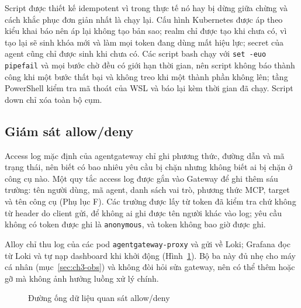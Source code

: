 \documentclass[a4paper]{article}
\begin{document}
Script được thiết kế idempotent vì trong thực tế nó hay bị dừng giữa chừng và cách khắc phục đơn giản nhất là chạy lại. Cấu hình Kubernetes được áp theo kiểu khai báo nên áp lại không tạo bản sao; realm chỉ được tạo khi chưa có, vì tạo lại sẽ sinh khóa mới và làm mọi token đang dùng mất hiệu lực; secret của agent cũng chỉ được sinh khi chưa có. Các script bash chạy với \texttt{set -euo pipefail} và mọi bước chờ đều có giới hạn thời gian, nên script không báo thành công khi một bước thất bại và không treo khi một thành phần không lên; tầng PowerShell kiểm tra mã thoát của WSL và báo lại kèm thời gian đã chạy. Script down chỉ xóa toàn bộ cụm.

\subsection{Giám sát allow/deny}\label{sec:obs}

Access log mặc định của agentgateway chỉ ghi phương thức, đường dẫn và mã trạng thái, nên biết có bao nhiêu yêu cầu bị chặn nhưng không biết ai bị chặn ở công cụ nào. Một quy tắc access log được gắn vào Gateway để ghi thêm sáu trường: tên người dùng, mã agent, danh sách vai trò, phương thức MCP, target và tên công cụ (Phụ lục F). Các trường được lấy từ token đã kiểm tra chứ không từ header do client gửi, để không ai ghi được tên người khác vào log; yêu cầu không có token được ghi là \texttt{anonymous}, và token không bao giờ được ghi.

Alloy chỉ thu log của các pod \texttt{agentgateway-proxy} và gửi về Loki; Grafana đọc từ Loki và tự nạp dashboard khi khởi động (Hình~\ref{fig:obs}). Bộ ba này đủ nhẹ cho máy cá nhân (mục~\ref{sec:ch3-obs}) và không đòi hỏi sửa gateway, nên có thể thêm hoặc gỡ mà không ảnh hưởng luồng xử lý chính.

\begin{figure}[htbp]\centering
{}
\caption{Đường ống dữ liệu quan sát allow/deny}\label{fig:obs}\end{figure}
\end{document}
